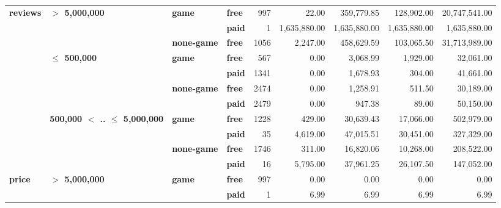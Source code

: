 \begin{tabular}{llll|rrrrr}
\cline{1-9}
\cline{2-9}
\cline{3-9}
\multirow{11}{*}{\textbf{reviews}} & \multirow{3}{*}{\textbf{$>$ 5,000,000}} & \multirow{2}{*}{\textbf{game}} & \textbf{free} &    997 &        22.00 &   359,779.85 &   128,902.00 & 20,747,541.00 \\
      &                                 &           & \textbf{paid} &      1 & 1,635,880.00 & 1,635,880.00 & 1,635,880.00 &  1,635,880.00 \\
\cline{3-9}
      &                                 & \textbf{none-game} & \textbf{free} &   1056 &     2,247.00 &   458,629.59 &   103,065.50 & 31,713,989.00 \\
\cline{2-9}
      & \multirow{4}{*}{\textbf{$\leq$ 500,000}} & \multirow{2}{*}{\textbf{game}} & \textbf{free} &    567 &         0.00 &     3,068.99 &     1,929.00 &     32,061.00 \\
      &                                 &           & \textbf{paid} &   1341 &         0.00 &     1,678.93 &       304.00 &     41,661.00 \\
\cline{3-9}
      &                                 & \multirow{2}{*}{\textbf{none-game}} & \textbf{free} &   2474 &         0.00 &     1,258.91 &       511.50 &     30,189.00 \\
      &                                 &           & \textbf{paid} &   2479 &         0.00 &       947.38 &        89.00 &     50,150.00 \\
\cline{2-9}
\cline{3-9}
      & \multirow{4}{*}{\textbf{500,000 $<$ .. $\leq$ 5,000,000}} & \multirow{2}{*}{\textbf{game}} & \textbf{free} &   1228 &       429.00 &    30,639.43 &    17,066.00 &    502,979.00 \\
      &                                 &           & \textbf{paid} &     35 &     4,619.00 &    47,015.51 &    30,451.00 &    327,329.00 \\
\cline{3-9}
      &                                 & \multirow{2}{*}{\textbf{none-game}} & \textbf{free} &   1746 &       311.00 &    16,820.06 &    10,268.00 &    208,522.00 \\
      &                                 &           & \textbf{paid} &     16 &     5,795.00 &    37,961.25 &    26,107.50 &    147,052.00 \\
\cline{1-9}
\cline{2-9}
\cline{3-9}
\multirow{11}{*}{\textbf{price}} & \multirow{3}{*}{\textbf{$>$ 5,000,000}} & \multirow{2}{*}{\textbf{game}} & \textbf{free} &    997 &         0.00 &         0.00 &         0.00 &          0.00 \\
      &                                 &           & \textbf{paid} &      1 &         6.99 &         6.99 &         6.99 &          6.99 \\

\end{tabular}
